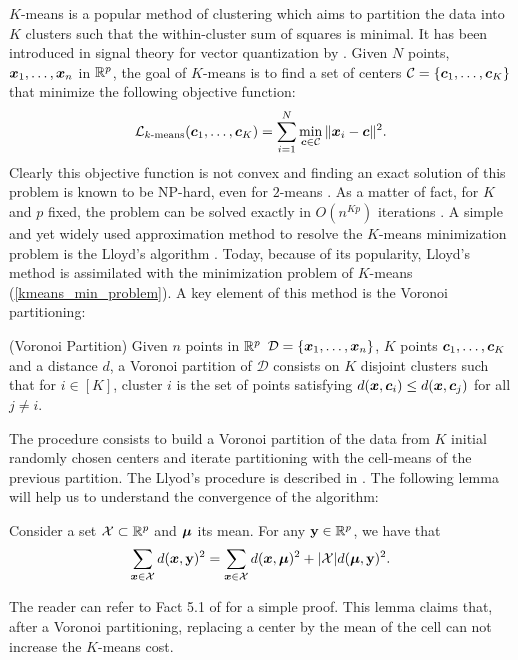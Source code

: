 $K$-means is a popular method of clustering which aims to partition the data into $K$ clusters such that the within-cluster sum of squares is minimal. It has been introduced in signal theory for vector quantization by \citep{macqueen1967}. Given $N$ points, $\boldsymbol x_1,\dots,\boldsymbol x_n$ in ${\mathbb R}^p$, the goal of $K$-means is to find a set of centers $\mathcal{C}=\{\boldsymbol c_1,\dots,\boldsymbol c_K\}$ that minimize the following objective function:
\begin{equation}
  \mathcal{L}_{k\textnormal{-means}}(\boldsymbol c_1,\dots,\boldsymbol c_K)=\sum_{i=1}^N\min_{\boldsymbol c \in \mathcal{C}}\|\boldsymbol x_i - \boldsymbol c \|^2.
  \label{kmeans_min_problem}
\end{equation}
Clearly this objective function is not convex and finding an exact solution of this problem is known to be NP-hard, even for $2$-means \citep{dasgupta2008hardness,Aloise:2009:NES:1519378.1519389}. As a matter of fact, for $K$ and $p$ fixed, the problem can be solved exactly in $O(n^{Kp})$ iterations \citep{Inaba:1994:AWV:177424.178042}. A simple and yet widely used approximation method to resolve the $K$-means minimization problem is the Lloyd's algorithm \citep{lloyd1982}. Today, because of its popularity, Lloyd's method is assimilated with the minimization problem of $K$-means (\cref{kmeans_min_problem}). A key element of this method is the Voronoi partitioning:
\begin{defi}{(Voronoi Partition)} 
Given $n$ points in ${\mathbb R}^p$ $\mathcal{D}=\{\boldsymbol x_1,\dots,\boldsymbol x_n\}$, $K$ points $\boldsymbol c_1,\dots,\boldsymbol c_K$ and a distance $d$, a Voronoi partition of $\mathcal{D}$ consists on $K$ disjoint clusters such that for $i\in[K]$, cluster $i$ is the set of points satisfying $d(\boldsymbol x, \boldsymbol c_i) \leq d(\boldsymbol x, \boldsymbol c_j)$ for all $j\neq i$.
\end{defi}
The procedure consists to build a Voronoi partition of the data from $K$ initial randomly chosen centers and iterate partitioning with the cell-means of the previous partition. The Llyod's procedure is described in . The following lemma will help us to understand the convergence of the algorithm:
\begin{lemma}
Consider a set $\mathcal{X} \subset{\mathbb R}^p$ and $\boldsymbol\mu$ its mean. For any $\mathbf y\in {\mathbb R}^p$, we have that 
\begin{equation}
  \sum_{\boldsymbol x \in \mathcal{X}} d(\boldsymbol x,\mathbf y)^2 = \sum_{\boldsymbol x\in\mathcal{X}}d(\boldsymbol x,\boldsymbol\mu)^2 + |\mathcal{X}|d(\boldsymbol\mu,\mathbf y)^2.
\end{equation}
\label{lemma_lloyd_decr_cost}
\end{lemma}
The reader can refer to Fact 5.1 of \cite{hennig2015handbook} for a simple proof. This lemma claims that, after a Voronoi partitioning, replacing a center by the mean of the cell can not increase the $K$-means cost.
